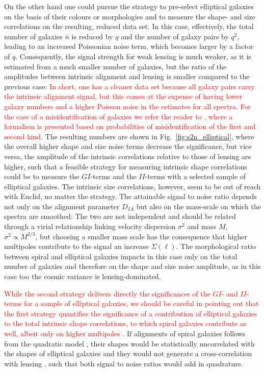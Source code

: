 \documentclass[a4paper,fleqn,usenatbib]{mnras}
\newcommand\spirou[1]{\textcolor{red}{#1}}
\begin{document}
On the other hand one could pursue the strategy to pre-select elliptical galaxies on the basis of their colours or morphologies and to measure the shape- and size correlations on the resulting, reduced data set. In this case, effectively, the total number of galaxies $\bar{n}$ is reduced by $q$ and the number of galaxy pairs by $q^2$, leading to an increased Poissonian noise term, which becomes larger by a factor of $q$. Consequently, the signal strength for weak lensing is much weaker, as it is estimated from a much smaller number of galaxies, but the ratio of the amplitudes between intrinsic alignment and lensing is smaller compared to the previous case: \spirou{In short, one has a cleaner data set because all galaxy pairs carry the intrinsic alignment signal, but this comes at the expense of having lower galaxy numbers and a higher Poisson noise in the estimates for all spectra. For the case of a misidentification of galaxies we refer the reader to \citet{tugendhat_statistical_2018}, where a formalism is presented based on probabilities of misidentification of the first and second kind.} The resulting numbers are shown in Fig.~\ref{fig:s2n_elliptical}, where the overall higher shape and size noise terms decrease the significance, but vice versa, the amplitude of the intrinsic correlations relative to those of lensing are higher, such that a feasible strategy for measuring intrinsic shape correlations could be to measure the $GI$-terms and the $II$-terms with a selected sample of elliptical galaxies. The intrinsic size correlations, however, seem to be out of reach with Euclid, no matter the strategy. The attainable signal to noise ratio depends not only on the alignment parameter $D_{IA}$ but also on the mass-scale on which the spectra are smoothed: The two are not independent and should be related through a virial relationship linking velocity dispersion $\sigma^2$ and mass $M$, $\sigma^2 \propto M^{2/3}$, but choosing a smaller mass scale has the consequence that higher multipoles contribute to the signal an increase $\Sigma(\ell)$. The morphological ratio between spiral and elliptical galaxies impacts in this case only on the total number of galaxies and therefore on the shape and size noise amplitude, as in this case too the cosmic variance is lensing-dominated. 

\spirou{While the second strategy delivers directly the significances of the $GI$- and $II$-terms for a sample of elliptical galaxies, we should be careful in pointing out that the first strategy quantifies the significance of a contribution of elliptical galaxies to the total intrinsic shape correlations, to which spiral galaxies contribute as well, albeit only on higher multipoles \citep{tugendhat_angular_2018}.} If alignments of spiral galaxies follows from the quadratic model \citep{crittenden_spin-induced_2001}, their shapes would be statistically uncorrelated with the shapes of elliptical galaxies and they would not generate a cross-correlation with lensing \citep{tugendhat_statistical_2018}, such that both signal to noise ratios would add in quadrature. 
\end{document}
